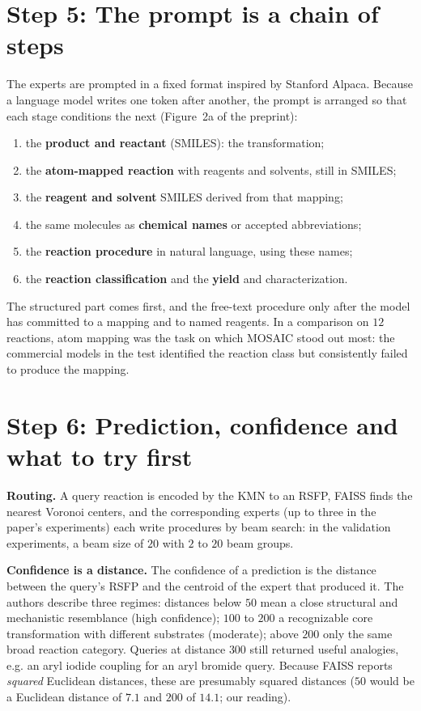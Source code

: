 \documentclass[11pt]{article}
\begin{document}
\section{Step 5: The prompt is a chain of steps}
The experts are prompted in a fixed format inspired by Stanford Alpaca. Because a language model writes one token after another, the prompt is arranged so that each stage conditions the next (Figure~2a of the preprint):
\begin{enumerate}[nosep]
  \item the \textbf{product and reactant} (SMILES): the transformation;
  \item the \textbf{atom-mapped reaction} with reagents and solvents, still in SMILES;
  \item the \textbf{reagent and solvent} SMILES derived from that mapping;
  \item the same molecules as \textbf{chemical names} or accepted abbreviations;
  \item the \textbf{reaction procedure} in natural language, using these names;
  \item the \textbf{reaction classification} and the \textbf{yield} and characterization.
\end{enumerate}
The structured part comes first, and the free-text procedure only after the model has committed to a mapping and to named reagents. In a comparison on $12$ reactions, atom mapping was the task on which MOSAIC stood out most: the commercial models in the test identified the reaction class but consistently failed to produce the mapping.

\section{Step 6: Prediction, confidence and what to try first}
\textbf{Routing.} A query reaction is encoded by the KMN to an RSFP, FAISS finds the nearest Voronoi centers, and the corresponding experts (up to three in the paper's experiments) each write procedures by beam search: in the validation experiments, a beam size of $20$ with $2$ to $20$ beam groups.

\textbf{Confidence is a distance.} The confidence of a prediction is the distance between the query's RSFP and the centroid of the expert that produced it. The authors describe three regimes: distances below $50$ mean a close structural and mechanistic resemblance (high confidence); $100$ to $200$ a recognizable core transformation with different substrates (moderate); above $200$ only the same broad reaction category. Queries at distance $300$ still returned useful analogies, e.g. an aryl iodide coupling for an aryl bromide query. Because FAISS reports \emph{squared} Euclidean distances, these are presumably squared distances ($50$ would be a Euclidean distance of $7.1$ and $200$ of $14.1$; our reading).
\end{document}

